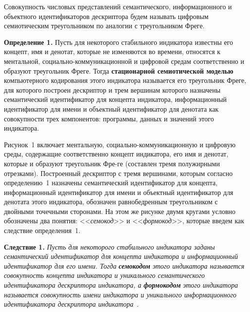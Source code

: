 \begin{multicols}{2}
   Совокупность числовых представлений семантического, информационного и объектного 
идентификаторов дескриптора будем называть цифровым семиотическим треугольником по 
аналогии с треугольником Фреге.
   
   \smallskip
   
   \noindent
   \textbf{Определение 1.} Пусть для некоторого стабильного индикатора известны 
его концепт, имя и денотат, которые не изменяются во времени, относятся к ментальной, 
социально-коммуникационной и цифровой средам соответственно и образуют треугольник 
Фреге. Тогда \textbf{стационарной семиотической моделью}
компьютерного кодирования этого индикатора называется его треугольник Фреге, для 
которого построен дескриптор и трем вершинам которого назначены семантический 
идентификатор для концепта индикатора, информационный идентификатор для имени и 
объектный идентификатор для денотата как совокупности трех компонентов: программы, 
данных и значений этого индикатора.
   \smallskip
   
   Рисунок~1 включает ментальную, социально-ком\-му\-ни\-ка\-ци\-он\-ную и циф\-ро\-вую среды, 
содержащие соответственно концепт индикатора, его имя и денотат, которые и образуют 
треугольник Фре-\linebreak ге (составлен тремя полужирными отрезками).\linebreak
 Построенный дескриптор с 
тремя вершинами,\linebreak
которым согласно определению~1 назначены семантический 
идентификатор для концепта, информационный идентификатор для имени и объектный 
идентификатор для денотата этого индикатора, обозначен равнобедренным треугольником с 
двойными точечными сторонами. На этом же рисунке двумя кругами условно обозначены 
два понятия: <<\textit{семокод}>> и <<\textit{формокод}>>, которые введем как следствие 
определения~1.
   
   \smallskip
   
   \noindent
   \textbf{Следствие 1.} \textit{Пусть для некоторого стабильного индикатора заданы 
семантический идентификатор для концепта индикатора и информационный идентификатор 
для его имени. Тогда} {\bfseries\textit{семокодом}} 
\textit{этого индикатора называется 
совокупность концепта индикатора и уникального семантического идентификатора 
дескриптора индикатора, а} {\bfseries\textit{формокодом}} 
\textit{этого индикатора называется совокупность имени 
индикатора и уникального информационного идентификатора дескриптора 
индикатора}~\cite{15-zat}.
   
   \smallskip
   

\end{multicols}
